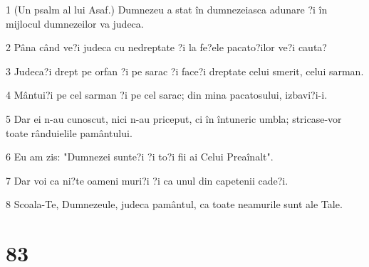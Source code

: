 \par 1 (Un psalm al lui Asaf.) Dumnezeu a stat în dumnezeiasca adunare ?i în mijlocul dumnezeilor va judeca.
\par 2 Pâna când ve?i judeca cu nedreptate ?i la fe?ele pacato?ilor ve?i cauta?
\par 3 Judeca?i drept pe orfan ?i pe sarac ?i face?i dreptate celui smerit, celui sarman.
\par 4 Mântui?i pe cel sarman ?i pe cel sarac; din mina pacatosului, izbavi?i-i.
\par 5 Dar ei n-au cunoscut, nici n-au priceput, ci în întuneric umbla; stricase-vor toate rânduielile pamântului.
\par 6 Eu am zis: "Dumnezei sunte?i ?i to?i fii ai Celui Preaînalt".
\par 7 Dar voi ca ni?te oameni muri?i ?i ca unul din capetenii cade?i.
\par 8 Scoala-Te, Dumnezeule, judeca pamântul, ca toate neamurile sunt ale Tale.

\chapter{83}

